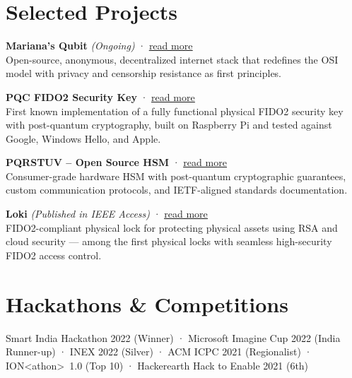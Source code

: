 \documentclass[10pt, a4paper]{article}
\begin{document}
\section*{Selected Projects}

\noindent\textbf{Mariana's Qubit} \textit{(Ongoing)} · \href{https://adityamitra5102.github.io/Marianas-Qubit}{\underline{read more}}\\
Open-source, anonymous, decentralized internet stack that redefines the OSI model with privacy and censorship resistance as first principles.

\vspace{4pt}

\noindent\textbf{PQC FIDO2 Security Key} · \href{https://github.com/AdityaMitra5102/RPi-PQC-FIDO-Key-Pin-support-ecdh}{\underline{read more}}\\
First known implementation of a fully functional physical FIDO2 security key with post-quantum cryptography, built on Raspberry Pi and tested against Google, Windows Hello, and Apple.

\vspace{4pt}

\noindent\textbf{PQRSTUV -- Open Source HSM} · \href{https://github.com/AdityaMitra5102/PQRSTUV-Docs}{\underline{read more}}\\
Consumer-grade hardware HSM with post-quantum cryptographic guarantees, custom communication protocols, and IETF-aligned standards documentation.

\vspace{4pt}

\noindent\textbf{Loki} \textit{(Published in IEEE Access)} · \href{https://adityamitra5102.github.io/blog/loki.html}{\underline{read more}}\\
FIDO2-compliant physical lock for protecting physical assets using RSA and cloud security --- among the first physical locks with seamless high-security FIDO2 access control.

\section*{Hackathons \& Competitions}

\noindent Smart India Hackathon 2022 (Winner) · Microsoft Imagine Cup 2022 (India Runner-up) · INEX 2022 (Silver) · ACM ICPC 2021 (Regionalist) · ION\textless athon\textgreater~1.0 (Top 10) · Hackerearth Hack to Enable 2021 (6th)
\end{document}
